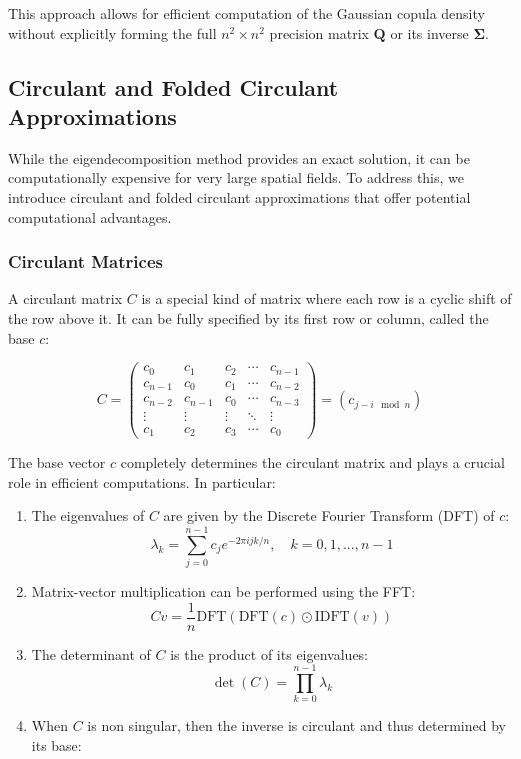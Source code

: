 \documentclass[journal=,manuscript=]{achemso}
\begin{document}
This approach allows for efficient computation of the Gaussian copula
density without explicitly forming the full \(n^2 \times n^2\) precision
matrix \(\mathbf{Q}\) or its inverse \(\mathbf{\Sigma}\).

\subsection{Circulant and Folded Circulant
Approximations}\label{circulant-and-folded-circulant-approximations}

While the eigendecomposition method provides an exact solution, it can
be computationally expensive for very large spatial fields. To address
this, we introduce circulant and folded circulant approximations that
offer potential computational advantages.

\subsubsection{Circulant Matrices}\label{circulant-matrices}

A circulant matrix \(C\) is a special kind of matrix where each row is a
cyclic shift of the row above it. It can be fully specified by its first
row or column, called the base \(c\):

\[
C = \begin{pmatrix}
c_0 & c_1 & c_2 & \cdots & c_{n-1} \\
c_{n-1} & c_0 & c_1 & \cdots & c_{n-2} \\
c_{n-2} & c_{n-1} & c_0 & \cdots & c_{n-3} \\
\vdots & \vdots & \vdots & \ddots & \vdots \\
c_1 & c_2 & c_3 & \cdots & c_0
\end{pmatrix} = (c_{j-i \mod n})
\]

The base vector \(c\) completely determines the circulant matrix and
plays a crucial role in efficient computations. In particular:

\begin{enumerate}
\def\labelenumi{\arabic{enumi}.}
\item
  The eigenvalues of \(C\) are given by the Discrete Fourier Transform
  (DFT) of \(c\): \[
  \lambda_k = \sum_{j=0}^{n-1} c_j e^{-2\pi i jk/n}, \quad k = 0, 1, ..., n-1
  \]
\item
  Matrix-vector multiplication can be performed using the FFT: \[
  Cv = \frac1n\text{DFT}(\text{DFT}(c) \odot \text{IDFT}(v))
  \]
\item
  The determinant of \(C\) is the product of its eigenvalues: \[
  \det(C) = \prod_{k=0}^{n-1} \lambda_k
  \]
\item
  When \(C\) is non singular, then the inverse is circulant and thus
  determined by its base:
\end{enumerate}
\end{document}
